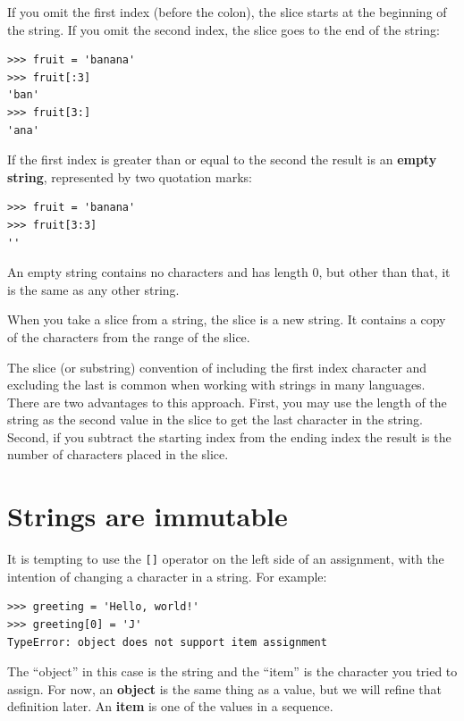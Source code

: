 If you omit the first index (before the colon), the slice starts at
the beginning of the string.  If you omit the second index, the slice
goes to the end of the string:

\beforeverb
\begin{verbatim}
>>> fruit = 'banana'
>>> fruit[:3]
'ban'
>>> fruit[3:]
'ana'
\end{verbatim}
\afterverb
%
If the first index is greater than or equal to the second the result
is an {\bf empty string}, represented by two quotation marks:


\beforeverb
\begin{verbatim}
>>> fruit = 'banana'
>>> fruit[3:3]
''
\end{verbatim}
\afterverb
%
An empty string contains no characters and has length 0, but other
than that, it is the same as any other string.



When you take a slice from a string, the slice is a new string. It contains a copy of the characters from the range of the slice.

The slice (or substring) convention of including the first index character and excluding the last is common when working with strings in many languages. There are two advantages to this approach. First, you may use the length of the string as the second value in the slice to get the last character in the string. Second, if you subtract the starting index from the ending index the result is the number of characters placed in the slice.

\section{Strings are immutable}

It is tempting to use the {\tt []} operator on the left side of an
assignment, with the intention of changing a character in a string.
For example:


\beforeverb
\begin{verbatim}
>>> greeting = 'Hello, world!'
>>> greeting[0] = 'J'
TypeError: object does not support item assignment
\end{verbatim}
\afterverb
%
The ``object'' in this case is the string and the ``item'' is
the character you tried to assign.  For now, an {\bf object} is
the same thing as a value, but we will refine that definition
later.  An {\bf item} is one of the values in a sequence.

